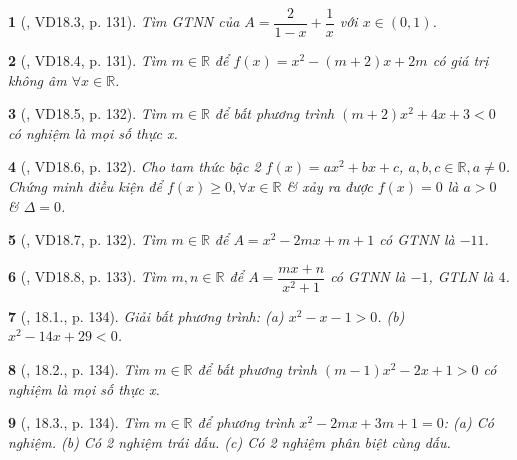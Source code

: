 \documentclass{article}
\newtheorem{baitoan}{}
\begin{document}
\begin{baitoan}[\cite{TLCT_THCS_Toan_9_dai_so}, VD18.3, p. 131]
	Tìm {\rm GTNN} của $A = \dfrac{2}{1 - x} + \dfrac{1}{x}$ với $x\in(0,1)$.
\end{baitoan}

\begin{baitoan}[\cite{TLCT_THCS_Toan_9_dai_so}, VD18.4, p. 131]
	Tìm $m\in\mathbb{R}$ để $f(x) = x^2 - (m + 2)x + 2m$ có giá trị không âm $\forall x\in\mathbb{R}$.
\end{baitoan}

\begin{baitoan}[\cite{TLCT_THCS_Toan_9_dai_so}, VD18.5, p. 132]
	Tìm $m\in\mathbb{R}$ để bất phương trình $(m + 2)x^2 + 4x + 3 < 0$ có nghiệm là mọi số thực x.
\end{baitoan}

\begin{baitoan}[\cite{TLCT_THCS_Toan_9_dai_so}, VD18.6, p. 132]
	Cho tam thức bậc 2 $f(x) = ax^2 + bx + c$, $a,b,c\in\mathbb{R},a\ne0$. Chứng minh điều kiện để $f(x)\ge0,\forall x\in\mathbb{R}$ \& xảy ra được $f(x) = 0$ là $a > 0$ \& $\Delta = 0$.
\end{baitoan}

\begin{baitoan}[\cite{TLCT_THCS_Toan_9_dai_so}, VD18.7, p. 132]
	Tìm $m\in\mathbb{R}$ để $A = x^2 - 2mx + m + 1$ có {\rm GTNN} là $-11$.
\end{baitoan}

\begin{baitoan}[\cite{TLCT_THCS_Toan_9_dai_so}, VD18.8, p. 133]
	Tìm $m,n\in\mathbb{R}$ để $A = \dfrac{mx + n}{x^2 + 1}$ có {\rm GTNN} là $-1$, {\rm GTLN} là $4$.
\end{baitoan}

\begin{baitoan}[\cite{TLCT_THCS_Toan_9_dai_so}, 18.1., p. 134]
	Giải bất phương trình: (a) $x^2 - x - 1 > 0$. (b) $x^2 - 14x + 29 < 0$.
\end{baitoan}

\begin{baitoan}[\cite{TLCT_THCS_Toan_9_dai_so}, 18.2., p. 134]
	Tìm $m\in\mathbb{R}$ để bất phương trình $(m - 1)x^2 - 2x + 1 > 0$ có nghiệm là mọi số thực x.
\end{baitoan}

\begin{baitoan}[\cite{TLCT_THCS_Toan_9_dai_so}, 18.3., p. 134]
	Tìm $m\in\mathbb{R}$ để phương trình $x^2 - 2mx + 3m + 1 = 0$: (a) Có nghiệm. (b) Có 2 nghiệm trái dấu. (c) Có 2 nghiệm phân biệt cùng dấu.
\end{baitoan}
\end{document}
